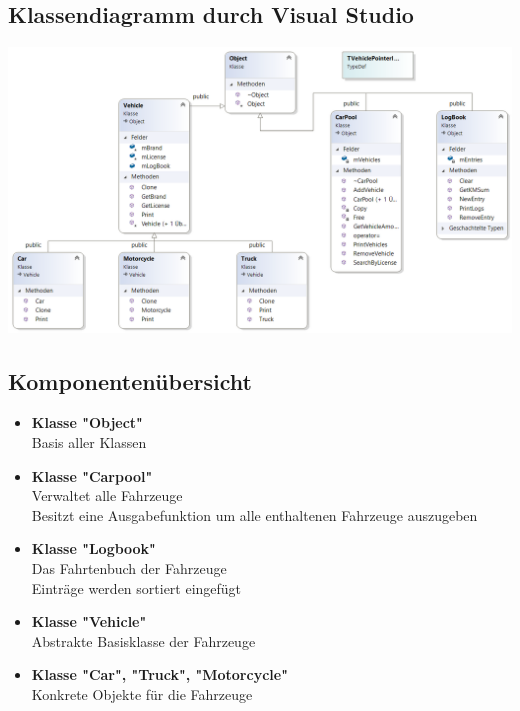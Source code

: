 \subsection{Klassendiagramm durch Visual Studio}
\includegraphics[scale=0.65]{./CarPool/ClassDiagram.png}

\subsection{Komponentenübersicht}

\begin{itemize}

\item \textbf{Klasse \string"Object"} \\
Basis aller Klassen

\item \textbf{Klasse "Carpool"}
\\ Verwaltet alle Fahrzeuge
\\ Besitzt eine Ausgabefunktion um alle enthaltenen Fahrzeuge auszugeben

\item \textbf{Klasse "Logbook"}
\\ Das Fahrtenbuch der Fahrzeuge
\\ Einträge werden sortiert eingefügt

\item \textbf{Klasse "Vehicle"}
\\ Abstrakte Basisklasse der Fahrzeuge


\item \textbf{Klasse "Car", "Truck", "Motorcycle"}
\\ Konkrete Objekte für die Fahrzeuge

\end{itemize}

